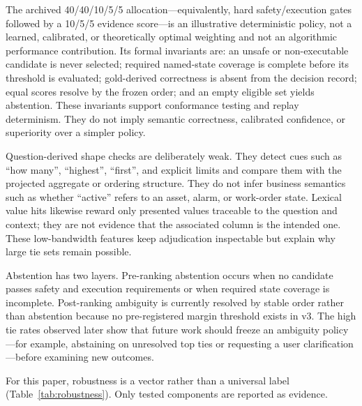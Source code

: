\documentclass[applsci,article,submit,moreauthors]{Definitions/mdpi}
\begin{document}
The archived 40/40/10/5/5 allocation---equivalently, hard safety/execution gates followed by a 10/5/5 evidence score---is an illustrative deterministic policy, not a learned, calibrated, or theoretically optimal weighting and not an algorithmic performance contribution. Its formal invariants are: an unsafe or non-executable candidate is never selected; required named-state coverage is complete before its threshold is evaluated; gold-derived correctness is absent from the decision record; equal scores resolve by the frozen order; and an empty eligible set yields abstention. These invariants support conformance testing and replay determinism. They do not imply semantic correctness, calibrated confidence, or superiority over a simpler policy.

Question-derived shape checks are deliberately weak. They detect cues such as ``how many'', ``highest'', ``first'', and explicit limits and compare them with the projected aggregate or ordering structure. They do not infer business semantics such as whether ``active'' refers to an asset, alarm, or work-order state. Lexical value hits likewise reward only presented values traceable to the question and context; they are not evidence that the associated column is the intended one. These low-bandwidth features keep adjudication inspectable but explain why large tie sets remain possible.

Abstention has two layers. Pre-ranking abstention occurs when no candidate passes safety and execution requirements or when required state coverage is incomplete. Post-ranking ambiguity is currently resolved by stable order rather than abstention because no pre-registered margin threshold exists in v3. The high tie rates observed later show that future work should freeze an ambiguity policy---for example, abstaining on unresolved top ties or requesting a user clarification---before examining new outcomes.

For this paper, robustness is a vector rather than a universal label (Table~\ref{tab:robustness}). Only tested components are reported as evidence.
\end{document}
